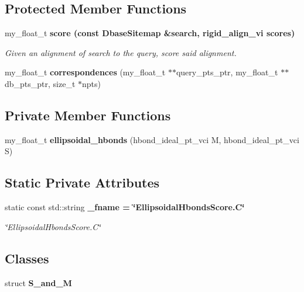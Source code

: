 \subsection*{Protected Member Functions}
\begin{CompactItemize}
\item 
my\_\-float\_\-t \bf{score} (const \bf{Dbase\-Sitemap} \&search, rigid\_\-align\_\-vi scores)
\begin{CompactList}\small\item\em Given an alignment of search to the query, score said alignment. \item\end{CompactList}\item 
my\_\-float\_\-t \textbf{correspondences} (my\_\-float\_\-t $\ast$$\ast$query\_\-pts\_\-ptr, my\_\-float\_\-t $\ast$$\ast$db\_\-pts\_\-ptr, size\_\-t $\ast$npts)\label{classASCbase_1_1EllipsoidalHbondsScore_0a9f3e22c78ef2bcca8664f02a7872f2}

\end{CompactItemize}
\subsection*{Private Member Functions}
\begin{CompactItemize}
\item 
my\_\-float\_\-t \textbf{ellipsoidal\_\-hbonds} (hbond\_\-ideal\_\-pt\_\-vci M, hbond\_\-ideal\_\-pt\_\-vci S)\label{classASCbase_1_1EllipsoidalHbondsScore_861b13badedb987217cec9af4e1195bd}

\end{CompactItemize}
\subsection*{Static Private Attributes}
\begin{CompactItemize}
\item 
static const std::string \bf{\_\-fname} = \char`\"{}Ellipsoidal\-Hbonds\-Score.C\char`\"{}\label{classASCbase_1_1EllipsoidalHbondsScore_5cdf6a4baeab56e974e38792877003f0}

\begin{CompactList}\small\item\em \char`\"{}Ellipsoidal\-Hbonds\-Score.C\char`\"{} \item\end{CompactList}\end{CompactItemize}
\subsection*{Classes}
\begin{CompactItemize}
\item 
struct \textbf{S\_\-and\_\-M}
\end{CompactItemize}


